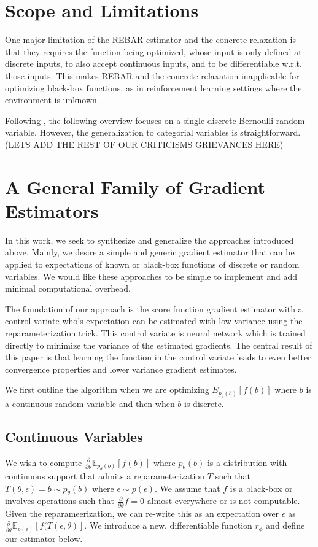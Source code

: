 \documentclass{article}
\newcommand{\E}{\mathbb{E}}
\newcommand{\PT}{\frac{\partial}{\partial \theta}}
\begin{document}
\section{Scope and Limitations}
\label{limitations}
One major limitation of the REBAR estimator and the concrete relaxation is that they requires the function being optimized, whose input is only defined at discrete inputs, to also accept continuous inputs, and to be differentiable w.r.t. those inputs.
This makes REBAR and the concrete relaxation inapplicable for optimizing black-box functions, as in reinforcement learning settings where the environment is unknown.

Following \cite{tucker2017rebar}, the following overview focuses on a single discrete Bernoulli random variable.
However, the generalization to categorial variables is straightforward.
(LETS ADD THE REST OF OUR CRITICISMS GRIEVANCES HERE)


\section{A General Family of Gradient Estimators}
In this work, we seek to synthesize and generalize the approaches introduced above. Mainly, we desire a simple and generic gradient estimator that can be applied to expectations of known or black-box functions of discrete or random variables. We would like these approaches to be simple to implement and add minimal computational overhead. 

The foundation of our approach is the score function gradient estimator with a control variate who's expectation can be estimated with low variance using the reparameterization trick. This control variate is neural network which is trained directly to minimize the variance of the estimated gradients. The central result of this paper is that learning the function in the control variate leads to even better convergence properties and lower variance gradient estimates. 

We first outline the algorithm when we are optimizing $E_{p_\theta(b)}[f(b)]$ where $b$ is a continuous random variable and then when $b$ is discrete.

\subsection{Continuous Variables}
We wish to compute $\PT\E_{p_\theta(b)}[f(b)]$ where $p_\theta(b)$ is a distribution with continuous support that admits a reparameterization $T$ such that $T(\theta, \epsilon) = b \sim p_\theta(b)$ where $\epsilon \sim p(\epsilon)$. We assume that $f$ is a black-box or involves operations such that $\PT f = 0$ almost everywhere or is not computable.  Given the reparameerization, we can re-write this as an expectation over $\epsilon$ as  $\PT\E_{p(\epsilon)}[f(T(\epsilon, \theta)]$. We introduce a new, differentiable function $r_\phi$ and define our estimator below.
\end{document}
